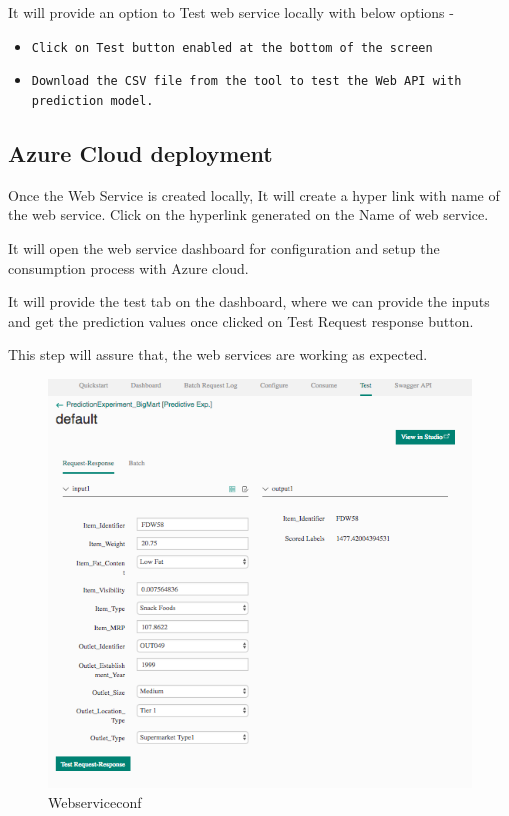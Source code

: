 It will provide an option to Test web service locally with below options -
\begin{itemize}
\item \verb|Click on Test button enabled at the bottom of the screen|
\item \verb|Download the CSV file from the tool to test the Web API with prediction model.|
\end{itemize}

\subsection{Azure Cloud deployment}
Once the Web Service is created locally, It will create a hyper link with 
name of the web service. 
Click on the hyperlink generated on the Name of web service.

It will open the web service dashboard for configuration and setup the 
consumption process with Azure cloud.

It will provide the test tab on the dashboard, where we can provide the 
inputs and get the prediction values once clicked on Test Request response 
button.

This step will assure that, the web services are working as expected.

\begin{figure}[pic7]
	\centering\includegraphics[width=\columnwidth]{Images/mlstudio/Webserviceconf.png}
	\caption{Webserviceconf}\label{fig:Webserviceconf}
\end{figure}


